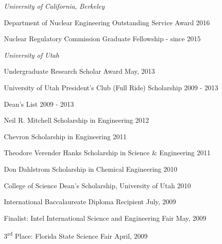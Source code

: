 
\begin{list1}
\item[] \textit{University of California, Berkeley}
\begin{list2}
\item Department of Nuclear Engineering Outstanding Service Award \hfill{2016}
\item Nuclear Regulatory Commission Graduate Fellowship \hfill{- since 2015}
\end{list2}
\item[] \textit{University of Utah}
\begin{list2}
\item  Undergraduate Research Scholar Award \hfill{May, 2013}
\item University of Utah President's Club (Full Ride) Scholarship \hfill{2009 - 2013}
\item Dean's List \hfill{2009 - 2013}
\item Neil R. Mitchell Scholarship in Engineering \hfill{2012}
\item Chevron Scholarship in Engineering \hfill{2011}
\item Theodore Verender Hanks Scholarship in Science \& Engineering \hfill{2011}
\item Don Dahlstrom Scholarship in Chemical Engineering \hfill{2010}
\item College of Science Dean's Scholarship, University of Utah \hfill{2010}
\end{list2}
\item[] International Baccalaureate Diploma Recipient  \hfill{July, 2009}
\item[] Finalist: Intel International Science and Engineering Fair  \hfill{ May, 2009}
\item[] 3\textsuperscript{rd} Place: Florida State Science Fair  \hfill{April, 2009}
\end{list1}


